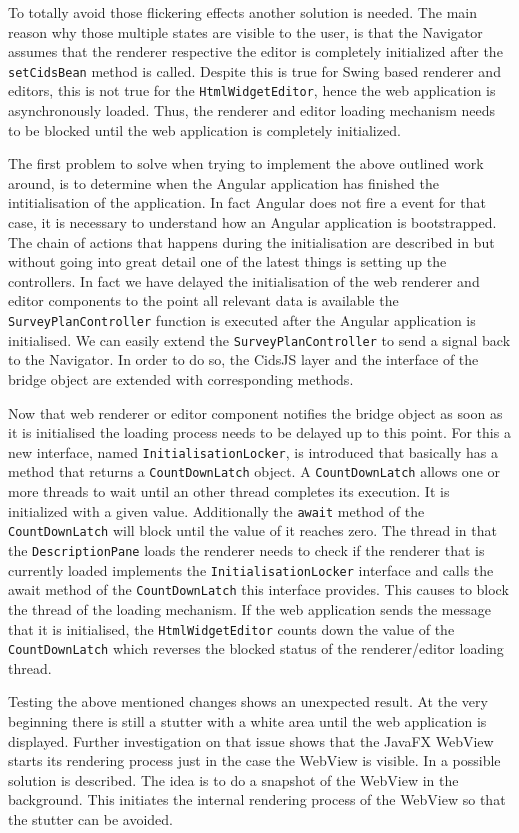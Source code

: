 To totally avoid those flickering effects another solution is needed. 
The main reason why those multiple states are visible to the user, is that the Navigator assumes that the renderer respective the editor is completely initialized after the \texttt{setCidsBean} method is called. 
Despite this is true for Swing based renderer and editors, this is not true for the \texttt{HtmlWidgetEditor}, hence the web application is asynchronously loaded. 
Thus, the renderer and editor loading mechanism needs to be blocked until the web application is completely initialized. 

The first problem to solve when trying to implement the above outlined work around, is to determine when the Angular application has finished the intitialisation of the application. 
In fact Angular does not fire a event for that case, it is necessary to understand how an Angular application is bootstrapped. 
The chain of actions that happens during the initialisation are described in \autocite{impl:ng-bootstrap} but without going into great detail one of the latest things is setting up the controllers. 
In fact we have delayed the initialisation of the web renderer and editor components to the point all relevant data is available the \texttt{SurveyPlanController} function is executed after the Angular application is initialised. We can easily extend the \texttt{SurveyPlanController} to send a signal back to the Navigator. 
In order to do so, the CidsJS layer and the interface of the bridge object are extended with corresponding methods.

Now that web renderer or editor component notifies the bridge object as soon as it is initialised the loading process needs to be delayed up to this point. 
For this a new interface, named \texttt{InitialisationLocker}, is introduced that basically has a method that returns a \texttt{CountDownLatch} object. 
A \texttt{CountDownLatch} allows one or more threads to wait until an other thread completes its execution. 
It is initialized with a given value. 
Additionally the \texttt{await} method of the \texttt{CountDownLatch} will block until the value of it reaches zero. 
The thread in that the \texttt{DescriptionPane} loads the renderer needs to check if the renderer that is currently loaded implements the \texttt{InitialisationLocker} interface and calls the await method of the \texttt{CountDownLatch} this interface provides.
This causes to block the thread of the loading mechanism. 
If the web application sends the message that it is initialised, the \texttt{HtmlWidgetEditor} counts down the value of the \texttt{CountDownLatch} which reverses the blocked status of the renderer/editor loading thread. 

Testing the above mentioned changes shows an unexpected result. 
At the very beginning there is still a stutter with a white area until the web application is displayed. 
Further investigation on that issue shows that the JavaFX WebView starts its rendering process just in the case the WebView is visible. 
In \autocite{impl:fx-snapshot} a possible solution is described. 
The idea is to do a snapshot of the WebView in the background. 
This initiates the internal rendering process of the WebView so that the stutter can be avoided.